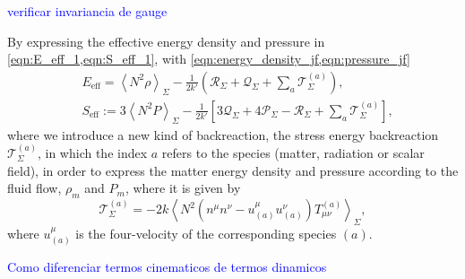 \textcolor{blue}{verificar invariancia de gauge}







By expressing the effective energy density and pressure in \cref{eqn:E_eff_1,eqn:S_eff_1}, with \cref{eqn:energy_density_jf,eqn:pressure_jf}
\begin{align}
    &E_{\mathrm{eff}} = \left\langle N^2 \rho\right\rangle_{\Sigma}-\frac{1}{2k'}\left(\mathcal{R}_\Sigma+\mathcal{Q}_{\Sigma}+\sum_a \mathcal{T}^{(a)}_{\Sigma}\right),\\
    &S_{\mathrm{eff}}:=3\left\langle N^2 P\right\rangle_{\Sigma}-\frac{1}{2k'}\left[3\mathcal{Q}_{\Sigma}+4\mathcal{P}_{\Sigma}-\mathcal{R}_\Sigma+\sum_a\mathcal{T}^{(a)}_{\Sigma}\right],
\end{align}
where we introduce a new kind of backreaction, the stress energy backreaction $\mathcal{T}^{(a)}_\Sigma$, in which the index $a$ refers to the species (matter, radiation or scalar field), in order to express the matter energy density and pressure according to the fluid flow, $\rho_m$ and $P_m$, where it is given by
\begin{equation}
    \mathcal{T}^{(a)}_{\Sigma}=-2k\left\langle N^2\left(n^\mu n^\nu-u^\mu_{(a)} u^\nu_{(a)}\right)T_{\mu\nu}^{(a)}\right\rangle_\Sigma,
\end{equation}
where $u_{(a)}^\mu$ is the four-velocity of the corresponding species $(a)$.



\textcolor{blue}{Como diferenciar termos cinematicos de termos dinamicos}




